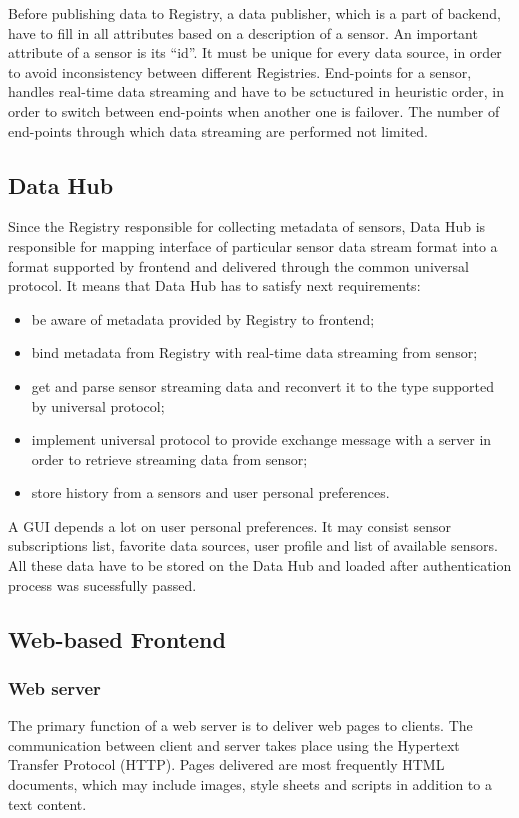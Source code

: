     Before publishing data to Registry, a data publisher, which is a part of backend, have to fill in all attributes based on a description of a sensor. An important attribute of a sensor is its ``id''. It must be unique for every data source, in order to avoid inconsistency between different Registries. End-points for a sensor, handles real-time data streaming and have to be sctuctured in heuristic order, in order to switch between end-points when another one is failover. The number of end-points through which data streaming are performed not limited.

  \subsection{Data Hub}
    Since the Registry responsible for collecting metadata of sensors, Data Hub is responsible for mapping interface of particular sensor data stream format into a format supported by frontend and delivered through the common universal protocol. It means that Data Hub has to satisfy next requirements:

    \begin{itemize}
    \item be aware of metadata provided by Registry to frontend;
    \item bind metadata from Registry with real-time data streaming from sensor;
    \item get and parse sensor streaming data and reconvert it to the type supported by universal protocol;
    \item implement universal protocol to provide exchange message with a server in order to retrieve streaming data from sensor;
    \item store history from a sensors and user personal preferences.
    \end{itemize}
    
    A GUI depends a lot on user personal preferences. It may consist sensor subscriptions list, favorite data sources, user profile and list of available sensors. All these data have to be stored on the Data Hub and loaded after authentication process was sucessfully passed.

  \subsection{Web-based Frontend}
  \label{section:web-frontend}
    \subsubsection{Web server}
    The primary function of a web server is to deliver web pages to clients. The communication between client and server takes place using the Hypertext Transfer Protocol (HTTP). Pages delivered are most frequently HTML documents, which may include images, style sheets and scripts in addition to a text content. 
  
